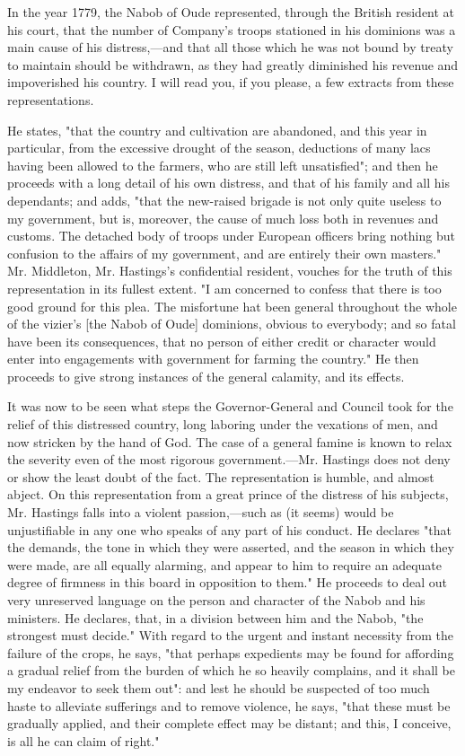 In the year 1779, the Nabob of Oude represented, through the British resident at his court, that the number of Company's troops stationed in his dominions was a main cause of his distress,—and that all those which he was not bound by treaty to maintain should be withdrawn, as they had greatly diminished his revenue and impoverished his country. I will read you, if you please, a few extracts from these representations.

He states, "that the country and cultivation are abandoned, and this year in particular, from the excessive drought of the season, deductions of many lacs having been allowed to the farmers, who are still left unsatisfied"; and then he proceeds with a long detail of his own distress, and that of his family and all his dependants; and adds, "that the new-raised brigade is not only quite useless to my government, but is, moreover, the cause of much loss both in revenues and customs. The detached body of troops under European officers bring nothing but confusion to the affairs of my government, and are entirely their own masters." Mr. Middleton, Mr. Hastings's confidential resident, vouches for the truth of this representation in its fullest extent. "I am concerned to confess that there is too good ground for this plea. The misfortune hat been general throughout the whole of the vizier's [the Nabob of Oude] dominions, obvious to everybody; and so fatal have been its consequences, that no person of either credit or character would enter into engagements with government for farming the country." He then proceeds to give strong instances of the general calamity, and its effects.

It was now to be seen what steps the Governor-General and Council took for the relief of this distressed country, long laboring under the vexations of men, and now stricken by the hand of God. The case of a general famine is known to relax the severity even of the most rigorous government.—Mr. Hastings does not deny or show the least doubt of the fact. The representation is humble, and almost abject. On this representation from a great prince of the distress of his subjects, Mr. Hastings falls into a violent passion,—such as (it seems) would be unjustifiable in any one who speaks of any part of his conduct. He declares "that the demands, the tone in which they were asserted, and the season in which they were made, are all equally alarming, and appear to him to require an adequate degree of firmness in this board in opposition to them." He proceeds to deal out very unreserved language on the person and character of the Nabob and his ministers. He declares, that, in a division between him and the Nabob, "the strongest must decide." With regard to the urgent and instant necessity from the failure of the crops, he says, "that perhaps expedients may be found for affording a gradual relief from the burden of which he so heavily complains, and it shall be my endeavor to seek them out": and lest he should be suspected of too much haste to alleviate sufferings and to remove violence, he says, "that these must be gradually applied, and their complete effect may be distant; and this, I conceive, is all he can claim of right."

